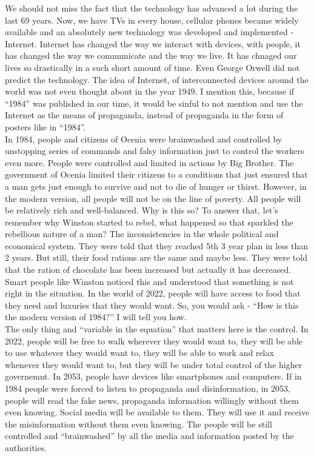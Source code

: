 \documentclass[a4paper,12pt]{article}
\begin{document}
We should not miss the fact that the technology has advanced a lot during the last 69 years. Now, we have TVs in every house, cellular phones became widely available and an absolutely new technology was developed and implemented - Internet. Internet has changed the way we interact with devices, with people, it has changed the way we communicate and the way we live. It has chnaged our lives so drastically in a such short amount of time. Even George Orwell did not predict the technology. The idea of Internet, of interconnected devices around the world was not even thought about in the year 1949. I mention this, because if ``1984'' was published in our time, it would be sinful to not mention and use the Internet as the means of propaganda, instead of propaganda in the form of posters like in ``1984''.\\



In 1984, people and citizens of Ocenia were brainwashed and controlled by unstopping series of commands and falsy information just to control the workers even more. People were controlled and limited in actions by Big Brother. The government of Ocenia limited their citizens to a conditions that just ensured that a man gets just enough to survive and not to die of hunger or thirst. However, in the modern version, all people will not be on the line of poverty. All people will be relatively rich and well-balanced. Why is this so? To answer that, let's remember why Winston started to rebel, what happened so that sparkled the rebellious nature of a man? The inconsistencies in the whole political and economical system. They were told that they reached 5th 3 year plan in less than 2 years. But still, their food rations are the same and maybe less. They were told that the ration of chocolate has been increased but actually it has decreased. Smart people like Winston noticed this and understood that something is not right in the situation. In the world of 2022, people will have access to food that they need and luxuries that they would want. So, you would ask - ``How is this the modern version of 1984?'' I will tell you how.\\


The only thing and ``variable in the equation'' that matters here is the control. In 2022, people will be free to walk wherever they would want to, they will be able to use whatever they would want to, they will be able to work and relax whenever they would want to, but they will be under total control of the higher governemnt. In 2053, people have devices like smartphones and computers. If in 1984 people were forced to listen to propaganda and disinformation, in 2053, people will read the fake news, propaganda information willingly without them even knowing. Social media will be available to them. They will use it and receive the misinformation without them even knowing. The people will be still controlled and ``brainwashed'' by all the media and information posted by the authorities. \\
\end{document}
